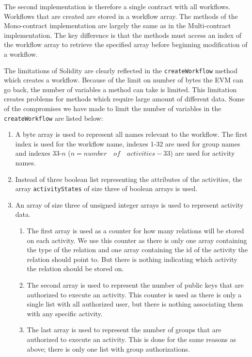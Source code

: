 \documentclass{article}
\begin{document}
	The second implementation is therefore a single contract with all workflows. 
	Workflows that are created are stored in a workflow array. 
	The methods of the Mono-contract implementation are largely the same as in the Multi-contract implementation. 
	The key difference is that the methods must access an index of the workflow array to retrieve the specified array before beginning modification of a workflow.

	The limitations of Solidity are clearly reflected in the \texttt{createWorkflow} method which creates a workflow. 
	Because of the limit on number of bytes the EVM can go back, the number of variables a method can take is limited. 
	This limitation creates problems for methods which require large amount of different data. 
	Some of the compromises we have made to limit the number of variables in the \texttt{createWorkflow} are listed below:
	\begin{enumerate}
		\item A byte array is used to represent all names relevant to the workflow. The first index is used for the workflow name, indexes 1-32 are used for group names and indexes 33-$n$ ($n = number \quad of \quad activities - 33$) are used for activity names.
		\item Instead of three boolean list representing the attributes of the activities, the array \texttt{activityStates} of size three of boolean arrays is used.
		\item An array of size three of unsigned integer arrays is used to represent activity data. 
		\begin{enumerate}
			\item The first array is used as a counter for how many relations will be stored on each activity. We use this counter as there is only one array containing the type of the relation and one array containing the id of the activity the relation should point to. But there is nothing indicating which activity the relation should be stored on.
			\item The second array is used to represent the number of public keys that are authorized to execute an activity. This counter is used as there is only a single list with all authorized user, but there is nothing associating them with any specific activity.
			\item The last array is used to represent the number of groups that are authorized to execute an activity. This is done for the same reasons as above; there is only one list with group authorizations.
		\end{enumerate}
	\end{enumerate}
\end{document}
